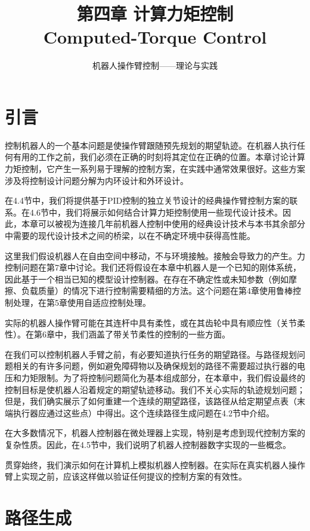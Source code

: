\documentclass[UTF8]{ctexart}
\title{\textbf{第四章 计算力矩控制}\\
\large Computed-Torque Control}
\author{机器人操作臂控制——理论与实践}
\date{}
\theoremstyle{definition}
\begin{document}
\maketitle
\fi

\section{引言}

控制机器人的一个基本问题是使操作臂跟随预先规划的期望轨迹。在机器人执行任何有用的工作之前，我们必须在正确的时刻将其定位在正确的位置。本章讨论计算力矩控制，它产生一系列易于理解的控制方案，在实践中通常效果很好。这些方案涉及将控制设计问题分解为内环设计和外环设计。

在4.4节中，我们将提供基于PID控制的独立关节设计的经典操作臂控制方案的联系。在4.6节中，我们将展示如何结合计算力矩控制使用一些现代设计技术。因此，本章可以被视为连接几年前机器人控制中使用的经典设计技术与本书其余部分中需要的现代设计技术之间的桥梁，以在不确定环境中获得高性能。

这里我们假设机器人在自由空间中移动，不与环境接触。接触会导致力的产生。力控制问题在第7章中讨论。我们还将假设在本章中机器人是一个已知的刚体系统，因此基于一个相当已知的模型设计控制器。在存在不确定性或未知参数（例如摩擦、负载质量）的情况下进行控制需要精细的方法。这个问题在第4章使用鲁棒控制处理，在第5章使用自适应控制处理。

实际的机器人操作臂可能在其连杆中具有柔性，或在其齿轮中具有顺应性（关节柔性）。在第6章中，我们涵盖了带关节柔性的控制的一些方面。

在我们可以控制机器人手臂之前，有必要知道执行任务的期望路径。与路径规划问题相关的有许多问题，例如避免障碍物以及确保规划的路径不需要超过执行器的电压和力矩限制。为了将控制问题简化为基本组成部分，在本章中，我们假设最终的控制目标是使机器人沿着规定的期望轨迹移动。我们不关心实际的轨迹规划问题；但是，我们确实展示了如何重建一个连续的期望路径，该路径从给定期望点表（末端执行器应通过这些点）中得出。这个连续路径生成问题在4.2节中介绍。

在大多数情况下，机器人控制器在微处理器上实现，特别是考虑到现代控制方案的复杂性质。因此，在4.5节中，我们说明了机器人控制器数字实现的一些概念。

贯穿始终，我们演示如何在计算机上模拟机器人控制器。在实际在真实机器人操作臂上实现之前，应该这样做以验证任何提议的控制方案的有效性。

\section{路径生成}
\end{document}

